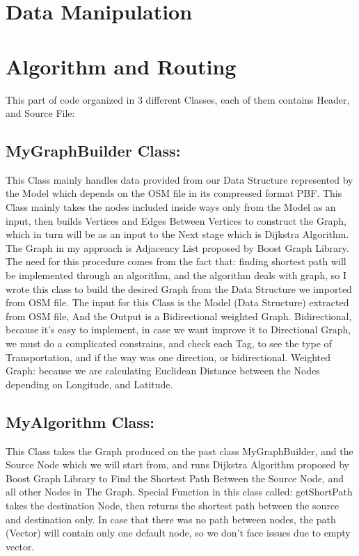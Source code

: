 \documentclass[a4paper, 12pt, english]{book}
\begin{document}
\section{Data Manipulation}

\section{Algorithm and Routing}

This part of code organized in 3 different Classes, each of them contains Header, and Source File:
\subsection{ MyGraphBuilder Class:}
This Class mainly handles data provided from our Data Structure represented by the Model which depends on the OSM file in its compressed format PBF.
This Class mainly takes the nodes included inside ways only from the
Model as an input, then builds Vertices and Edges Between Vertices to construct the Graph, which in turn will be as an input to the Next stage which is Dijkstra Algorithm.
The Graph in my approach is Adjacency List proposed by Boost Graph Library.
The need for this procedure comes from the fact that: finding shortest path will be implemented through an algorithm, and the algorithm deals with graph, so I wrote this class to build the desired Graph from the Data Structure we imported from OSM file.
The input for this Class is the Model (Data Structure) extracted from OSM file, 
And the Output is a Bidirectional weighted Graph.
Bidirectional, because it’s easy to implement, in case we want improve it to Directional Graph, we must do a complicated constrains, and check each Tag, to see the type of Transportation, and if the way was one direction, or bidirectional.
Weighted Graph: because we are calculating Euclidean Distance between the Nodes depending on Longitude, and Latitude.
\subsection{ MyAlgorithm Class:}
This Class takes the Graph produced on the past class MyGraphBuilder, and the Source Node which we will start from, and runs Dijkstra Algorithm proposed by Boost Graph Library to Find the Shortest Path Between the Source Node, and all other Nodes in The Graph.
Special Function in this class called: getShortPath takes the destination Node, then returns the shortest path between the source and destination only.
In case that there was no path between nodes, the path (Vector) will contain only one default node, so we don’t face issues due to empty vector.
\end{document}
